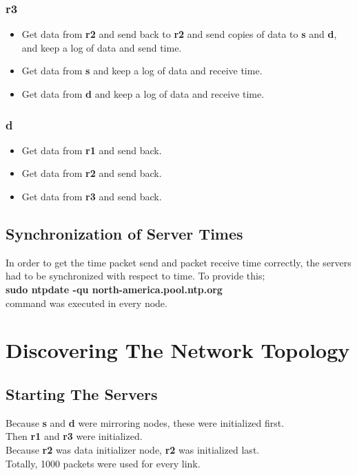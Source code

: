 \documentclass[conference]{IEEEtran}
\begin{document}
\subsubsection{\textbf{r3}}
\begin{itemize}
    \item Get data from \textbf{r2} and send back to \textbf{r2} and send copies of data to \textbf{s} and \textbf{d}, and keep a log of data and send time.
    \item Get data from \textbf{s} and keep a log of data and receive time.
    \item Get data from \textbf{d} and keep a log of data and receive time.
\end{itemize}
\subsubsection{\textbf{d}}
\begin{itemize}
    \item Get data from \textbf{r1} and send back.
    \item Get data from \textbf{r2} and send back.
    \item Get data from \textbf{r3} and send back.
\end{itemize}

\subsection{Synchronization of Server Times}

In order to get the time packet send and packet receive time correctly, the servers had to be synchronized with respect to time. To provide this; \\
\textbf{sudo ntpdate -qu north-america.pool.ntp.org} \\
command was executed in every node.

\section{Discovering The Network Topology}


\subsection{Starting The Servers}

Because \textbf{s} and \textbf{d} were mirroring nodes, these were initialized first. \\
Then \textbf{r1} and \textbf{r3} were initialized. \\
Because \textbf{r2} was data initializer node, \textbf{r2} was initialized last.\\
Totally, 1000 packets were used for every link.
\end{document}
